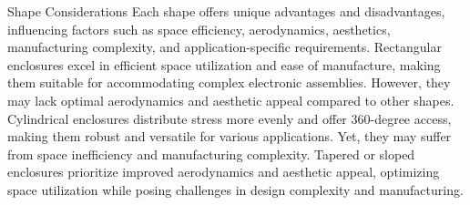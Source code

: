 Shape Considerations
Each shape offers unique advantages and disadvantages, influencing factors such as space efficiency, aerodynamics, aesthetics, manufacturing complexity, and application-specific requirements.
Rectangular enclosures excel in efficient space utilization and ease of manufacture, making them suitable for accommodating complex electronic assemblies. However, they may lack optimal aerodynamics and aesthetic appeal compared to other shapes.
Cylindrical enclosures distribute stress more evenly and offer 360-degree access, making them robust and versatile for various applications. Yet, they may suffer from space inefficiency and manufacturing complexity.
Tapered or sloped enclosures prioritize improved aerodynamics and aesthetic appeal, optimizing space utilization while posing challenges in design complexity and manufacturing.


